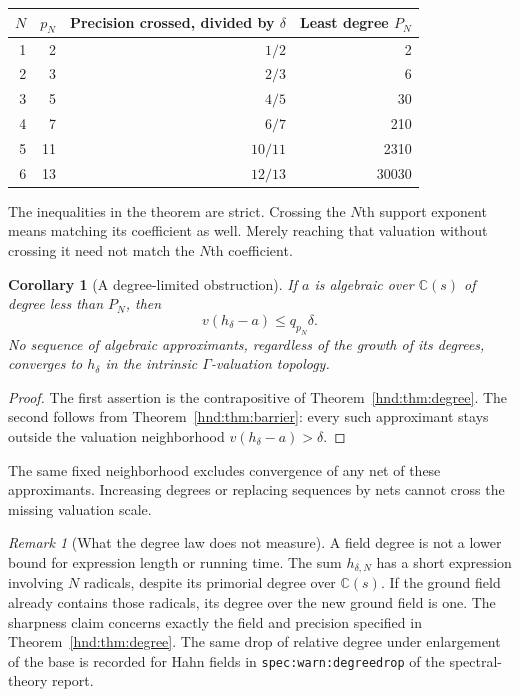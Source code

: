 \documentclass[11pt,oneside]{article}
\newtheorem{corollary}[theorem]{Corollary}
\theoremstyle{definition}
\theoremstyle{remark}
\newtheorem{remark}[theorem]{Remark}
\newcommand{\C}{\mathbb C}
\newcommand{\lbl}[1]{\nolinkurl{#1}}%
\begin{document}
\begin{center}
\begin{tabular}{rrrr}
\toprule
$N$ & $p_N$ & Precision crossed, divided by $\delta$ & Least degree $P_N$\\
\midrule
1&2&$1/2$&2\\
2&3&$2/3$&6\\
3&5&$4/5$&30\\
4&7&$6/7$&210\\
5&11&$10/11$&2310\\
6&13&$12/13$&30030\\
\bottomrule
\end{tabular}
\end{center}

The inequalities in the theorem are strict. Crossing the $N$th support
exponent means matching its coefficient as well. Merely reaching that
valuation without crossing it need not match the $N$th coefficient.

\begin{corollary}[A degree-limited obstruction]\label{hnd:cor:degreebound}
If $a$ is algebraic over $\C(s)$ of degree less than $P_N$, then
\[
 v(h_\delta-a)\le q_{p_N}\delta.
\]
No sequence of algebraic approximants, regardless of the growth of
its degrees, converges to $h_\delta$ in the intrinsic $\Gamma$-valuation topology.
\end{corollary}
\begin{proof}
The first assertion is the contrapositive of
Theorem~\ref{hnd:thm:degree}. The second follows from
Theorem~\ref{hnd:thm:barrier}: every such approximant stays outside the
valuation neighborhood $v(h_\delta-a)>\delta$.
\end{proof}
The same fixed neighborhood excludes convergence of any net of these
approximants. Increasing degrees or replacing sequences by nets cannot
cross the missing valuation scale.

\begin{remark}[What the degree law does not measure]\label{hnd:rem:degreescope}
A field degree is not a lower bound for expression length or running
time. The sum $h_{\delta,N}$ has a short expression involving $N$
radicals, despite its primorial degree over $\C(s)$. If the ground field
already contains those radicals, its degree over the new ground field
is one. The sharpness claim concerns exactly the field and precision
specified in Theorem~\ref{hnd:thm:degree}. The same drop of relative
degree under enlargement of the base is recorded for Hahn fields in
\lbl{spec:warn:degreedrop} of the spectral-theory report.
\end{remark}
\end{document}
